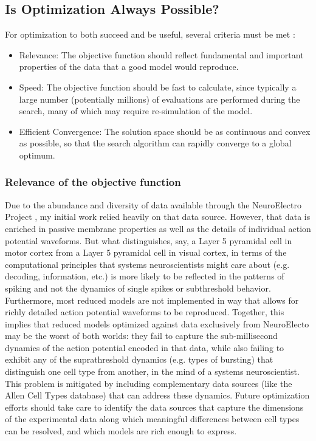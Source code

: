 \subsection{Is Optimization Always Possible?} 
For optimization to both succeed and be useful, several criteria must be met \cite{van2007neurofitter}:
\begin{itemize}
\item Relevance: The objective function should reflect fundamental and important properties of the data that a good model would reproduce.
\item Speed: The objective function should be fast to calculate, since typically a large number (potentially millions) of evaluations are performed during the search, many of which may require re-simulation of the model.
\item Efficient Convergence: The solution space should be as continuous and convex as possible, so that the search algorithm can rapidly converge to a global optimum.
\end{itemize}


\subsubsection{Relevance of the objective function}
Due to the abundance and diversity of data available through the NeuroElectro Project \cite{tripathy2014neuroelectro}, my initial work relied heavily on that data source.
However, that data is enriched in passive membrane properties as well as the details of individual action potential waveforms.
But what distinguishes, say, a Layer 5 pyramidal cell in motor cortex from a Layer 5 pyramidal cell in visual cortex, in terms of the computational principles that systems neuroscientists might care about (e.g. decoding, information, etc.) is more likely to be reflected in the patterns of spiking and not the dynamics of single spikes or subthreshold behavior.
Furthermore, most reduced models are not implemented in way that allows for richly detailed action potential waveforms to be reproduced.
Together, this implies that reduced models optimized against data exclusively from NeuroElecto may be the worst of both worlds: they fail to capture the sub-millisecond dynamics of the action potential encoded in that data, while also failing to exhibit any of the suprathreshold dynamics (e.g. types of bursting) that distinguish one cell type from another, in the mind of a systems neuroscientist.
This problem is mitigated by including complementary data sources (like the Allen Cell Types database) that can address these dynamics.
Future optimization efforts should take care to identify the data sources that capture the dimensions of the experimental data along which meaningful differences between cell types can be resolved, and which models are rich enough to express.


